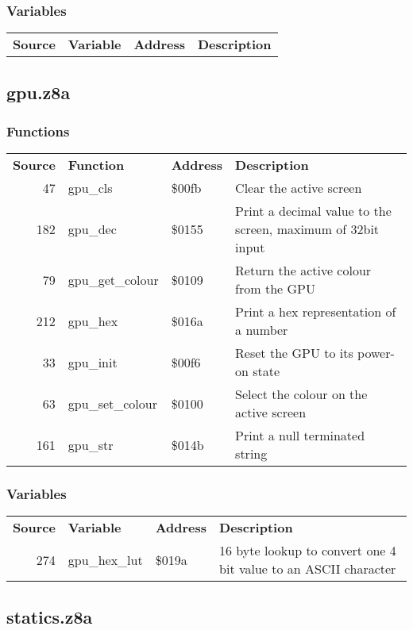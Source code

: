 \subsubsection{Variables}
\begin{tabular}{rllp{7cm}}
 \textbf{Source}&\textbf{Variable}&\textbf{Address}&\textbf{Description}\\
\end{tabular}

\subsection{gpu.z8a}
\subsubsection{Functions}
\begin{tabular}{rllp{7cm}}
 \textbf{Source}&\textbf{Function}&\textbf{Address}&\textbf{Description}\\
 47&gpu\_cls&\$00fb&Clear the active screen\\
 182&gpu\_dec&\$0155&Print a decimal value to the screen, maximum of 32bit input\\
 79&gpu\_get\_colour&\$0109&Return the active colour from the GPU\\
 212&gpu\_hex&\$016a&Print a hex representation of a number\\
 33&gpu\_init&\$00f6&Reset the GPU to its power-on state\\
 63&gpu\_set\_colour&\$0100&Select the colour on the active screen\\
 161&gpu\_str&\$014b&Print a null terminated string\\
\end{tabular}

\subsubsection{Variables}
\begin{tabular}{rllp{7cm}}
 \textbf{Source}&\textbf{Variable}&\textbf{Address}&\textbf{Description}\\
 274&gpu\_hex\_lut&\$019a&16 byte lookup to convert one 4 bit value to an ASCII character\\
\end{tabular}

\subsection{statics.z8a}
